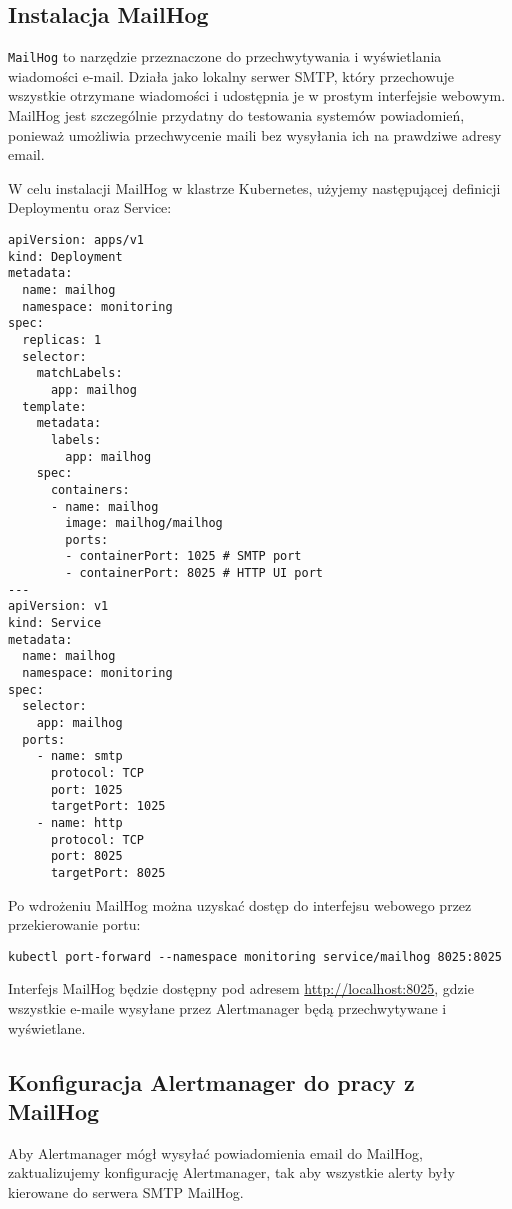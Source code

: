 \documentclass{article}
\begin{document}
\subsection{Instalacja MailHog}

\texttt{MailHog} to narzędzie przeznaczone do przechwytywania i wyświetlania wiadomości e-mail. Działa jako lokalny serwer SMTP, który przechowuje wszystkie otrzymane wiadomości i udostępnia je w prostym interfejsie webowym. MailHog jest szczególnie przydatny do testowania systemów powiadomień, ponieważ umożliwia przechwycenie maili bez wysyłania ich na prawdziwe adresy email.

W celu instalacji MailHog w klastrze Kubernetes, użyjemy następującej definicji Deploymentu oraz Service:

\begin{lstlisting}
apiVersion: apps/v1
kind: Deployment
metadata:
  name: mailhog
  namespace: monitoring
spec:
  replicas: 1
  selector:
    matchLabels:
      app: mailhog
  template:
    metadata:
      labels:
        app: mailhog
    spec:
      containers:
      - name: mailhog
        image: mailhog/mailhog
        ports:
        - containerPort: 1025 # SMTP port
        - containerPort: 8025 # HTTP UI port
---
apiVersion: v1
kind: Service
metadata:
  name: mailhog
  namespace: monitoring
spec:
  selector:
    app: mailhog
  ports:
    - name: smtp
      protocol: TCP
      port: 1025
      targetPort: 1025
    - name: http
      protocol: TCP
      port: 8025
      targetPort: 8025
\end{lstlisting}

Po wdrożeniu MailHog można uzyskać dostęp do interfejsu webowego przez przekierowanie portu:

\begin{lstlisting}
kubectl port-forward --namespace monitoring service/mailhog 8025:8025
\end{lstlisting}

Interfejs MailHog będzie dostępny pod adresem \url{http://localhost:8025}, gdzie wszystkie e-maile wysyłane przez Alertmanager będą przechwytywane i wyświetlane.

\subsection{Konfiguracja Alertmanager do pracy z MailHog}

Aby Alertmanager mógł wysyłać powiadomienia email do MailHog, zaktualizujemy konfigurację Alertmanager, tak aby wszystkie alerty były kierowane do serwera SMTP MailHog.
\end{document}
